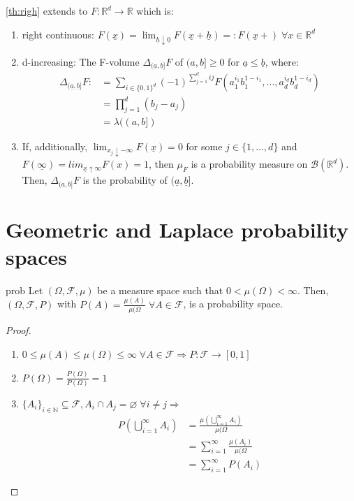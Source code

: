 \documentclass{article}
\begin{document}
	\begin{myrem}{}{}
		\ref{th:righ} extends to $F : \mathbb{R}^d\to\mathbb{R}$ which is:
		\begin{enumerate}[label=(\roman*)]
			\item right continuous: $F(\underline{x})=\lim_{\underline{h}\downarrow\underline{0}}F(\underline{x}+\underline{h})=:F(\underline{x}+)\;\forall x\in\mathbb{R}^d$
			\item d-increasing: The F-volume $\Delta_{(\underline{a}, \underline{b}]}F$ of $(a, b]\geq0$ for $\underline{a}\leq\underline{b}$, where:
			\begin{align*}
				\Delta_{(\underline{a}, \underline{b}]}F:&=\sum_{i\in\{0, 1\}^d}(-1)^{\sum_{j=1}^{d}ij}F(a_1^{i_1}b_1^{1-i_1}, ..., a_d^{i_d}b_d^{1-i_d})\\
				&=\prod_{j=1}^{d}(b_j-a_j)\\
				&=\lambda((a, b])
			\end{align*}
			\item If, additionally, $\lim_{x_j\downarrow-\infty}F(\underline{x})=0$ for some $j\in\{1, ..., d\}$ and $F(\underline{\infty})=lim_{\underline{x}\uparrow\infty}F(x)=1$, then $\mu_F$ is a probability measure on $\mathcal{B}(\mathbb{R}^d)$. Then, $\Delta_{(a, b]}F$ is the probability of $(\underline{a}, \underline{b}]$.
		\end{enumerate}
	\end{myrem}
	
	\newpage
	\section{Geometric and Laplace probability spaces}
	
	\begin{myprop}{}{prob}
		Let $(\Omega, \mathcal{F}, \mu)$ be a measure space such that $0<\mu(\Omega)<\infty$. Then, $(\Omega, \mathcal{F}, P)$ with $P(A)=\frac{\mu(A)}{\mu(\Omega}\;\forall A\in\mathcal{F}$, is a probability space. 
		
		\begin{proof}~\\
			\begin{enumerate}[label=(\roman*)]
				\item $0\leq\mu(A)\leq\mu(\Omega)\leq\infty\;\forall A\in\mathcal{F}\Rightarrow P : \mathcal{F}\to[0, 1]$
				\item $P(\Omega)=\frac{P(\Omega)}{P(\Omega)}=1$
				\item $\{A_i\}_{i\in\mathbb{N}}\subseteq\mathcal{F}, A_i\cap A_j=\varnothing\;\forall i\neq j\Rightarrow$
				\begin{align*}
					P(\bigcup_{i=1}^{\infty}A_i)&=\frac{\mu(\bigcup_{i=1}^{\infty}A_i)}{\mu(\Omega}\\
					&=\sum_{i=1}^{\infty}\frac{\mu(A_i)}{\mu(\Omega}\\
					&=\sum_{i=1}^{\infty}P(A_i)
				\end{align*}
			\end{enumerate}
		\end{proof}
	\end{myprop}
	
\end{document}
